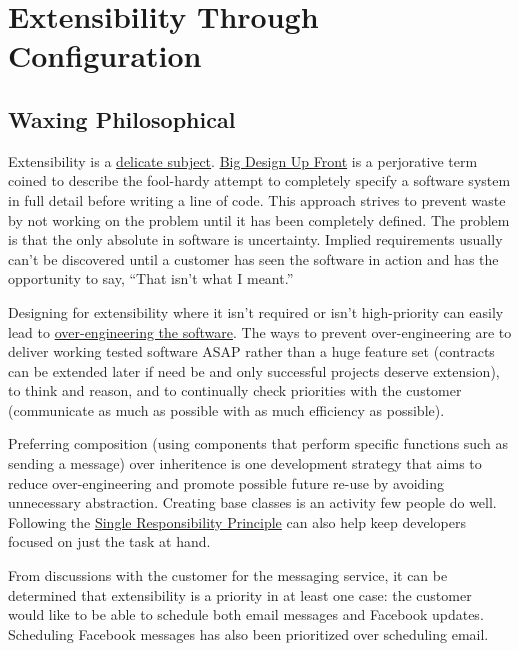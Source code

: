 
\chapter{Extensibility Through Configuration}
\section{Waxing Philosophical}
Extensibility is a \href{http://webarya.wordpress.com/2010/05/28/my-ten-development-principles/}{delicate subject}. \href{http://c2.com/xp/BigDesignUpFront.html}{Big Design Up Front} is a perjorative term coined to describe the fool-hardy attempt to completely specify a software system in full detail before writing a line of code. This approach strives to prevent waste by not working on the problem until it has been completely defined. The problem is that the only absolute in software is uncertainty. Implied requirements usually can't be discovered until a customer has seen the software in action and has the opportunity to say, ``That isn't what I meant.'' 

Designing for extensibility where it isn't required or isn't high-priority can easily lead to \href{http://blog.digitalstruct.com/2008/02/17/over-engineering-software/}{over-engineering the software}. The ways to prevent over-engineering are to deliver working tested software ASAP rather than a huge feature set (contracts can be extended later if need be and only successful projects deserve extension), to think and reason, and to continually check priorities with the customer (communicate as much as possible with as much efficiency as possible).

Preferring composition (using components that perform specific functions such as sending a message) over inheritence is one development strategy that aims to reduce over-engineering and promote possible future re-use by avoiding unnecessary abstraction. Creating base classes is an activity few people do well. Following the \href{http://www.objectmentor.com/resources/articles/srp.pdf}{Single Responsibility Principle} can also help keep developers focused on just the task at hand.

From discussions with the customer for the messaging service, it can be determined that extensibility is a priority in at least one case: the customer would like to be able to schedule both email messages and Facebook updates. Scheduling Facebook messages has also been prioritized over scheduling email.

